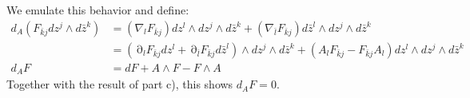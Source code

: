 \documentclass[12 pt]{article}
\DeclareMathOperator {\p} {\partial}
\theoremstyle{plain}
\theoremstyle{definition}
\theoremstyle{remark}
\begin{document}
We emulate this behavior and define:
\begin{align*}
      d_A ( F_{\bar k j} dz^j \wedge d \bar z^k ) &= (\nabla_l F_{\bar k j}) dz^l \wedge dz^j \wedge d \bar z^k  + (\nabla_{\bar l} F_{\bar k j}) d\bar z^l \wedge dz^j \wedge d \bar z^k   \\
&= (\p_l F_{\bar k j} dz^l  + \p_{\bar l} F_{\bar k j} d \bar z^l ) \wedge dz^j \wedge d\bar z^k + (A_l F_{\bar k j} - F_{\bar k j} A_l) dz^l \wedge dz^j \wedge d\bar z^k  \\
d_A F &= dF + A \wedge F - F \wedge A
\end{align*}
Together with the result of part c), this shows $d_A F = 0$.
\end{document}
